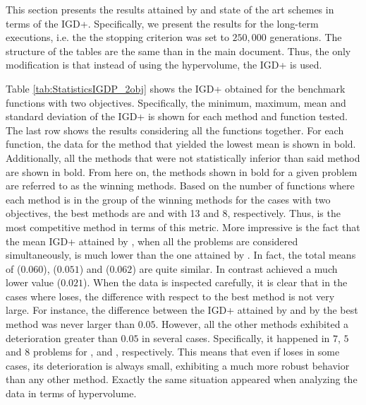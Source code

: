 



This section presents the results attained by \VSDMOEA{} and state of the art schemes in terms of
the IGD+\cite{Joel:Inverted_Generational_Distance_Plus}.
%
Specifically, we present the results for the long-term executions, i.e. the
the stopping criterion was set to $250,000$ generations.
%
The structure of the tables are the same than in the main document.
%
Thus, the only modification is that instead of using the hypervolume, the IGD+ is used.

Table \ref{tab:StatisticsIGDP_2obj} shows the IGD+ obtained for the benchmark functions with two objectives.
%
Specifically, the minimum, maximum, mean and standard deviation of the IGD+ is shown for each method and function tested.
%
The last row shows the results considering all the functions together.
%
For each function, the data for the method that yielded the lowest mean is shown in bold.
%
Additionally, all the methods that were not statistically inferior than said method are shown in bold.
%
From here on, the methods shown in bold for a given problem are referred to as the winning methods.
%
Based on the number of functions where each method is in the group of the winning methods for the cases 
with two objectives, the best methods are \VSDMOEA{} and \RMOEA{} with 13 and 8, respectively.
%
Thus, \VSDMOEA{} is the most competitive method in terms of this metric.
%
More impressive is the fact that the mean IGD+ attained by \VSDMOEA{}, when all the problems are considered simultaneously, is much lower 
than the one attained by \RMOEA{}.
%
In fact, the total means of \RMOEA{} ($0.060$), \NSGAII{} ($0.051$) and \MOEAD{} ($0.062$) are quite similar.
%
In contrast \VSDMOEA{} achieved a much lower value ($0.021$).
%
When the data is inspected carefully, it is clear that in the cases where \VSDMOEA{} loses, the difference with respect to the
best method is not very large.
%
For instance, the difference between the IGD+ attained by \VSDMOEA{} and by the best method was never larger
than $0.05$.
%
However, all the other methods exhibited a deterioration greater than $0.05$ in several cases.
%
Specifically, it happened in $7$, $5$ and $8$ problems for \MOEAD{}, \NSGAII{} and \RMOEA{}, respectively.
%
This means that even if \VSDMOEA{} loses in some cases, its deterioration is always small, exhibiting a much more 
robust behavior than any other method.
%
Exactly the same situation appeared when analyzing the data in terms of hypervolume.

